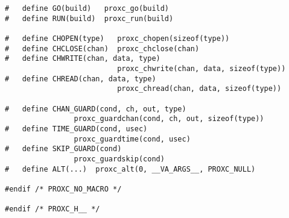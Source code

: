 \begin{lstlisting}[style=CustomC,caption={API header file for ProXC},label={lst:api_header_file_proxc}]
#   define GO(build)   proxc_go(build)
#   define RUN(build)  proxc_run(build)

#   define CHOPEN(type)   proxc_chopen(sizeof(type))
#   define CHCLOSE(chan)  proxc_chclose(chan)
#   define CHWRITE(chan, data, type)  
                          proxc_chwrite(chan, data, sizeof(type))
#   define CHREAD(chan, data, type)   
                          proxc_chread(chan, data, sizeof(type)) 

#   define CHAN_GUARD(cond, ch, out, type)  
                proxc_guardchan(cond, ch, out, sizeof(type))
#   define TIME_GUARD(cond, usec)           
                proxc_guardtime(cond, usec)
#   define SKIP_GUARD(cond)                 
                proxc_guardskip(cond)
#   define ALT(...)  proxc_alt(0, __VA_ARGS__, PROXC_NULL)

#endif /* PROXC_NO_MACRO */

#endif /* PROXC_H__ */
\end{lstlisting}
